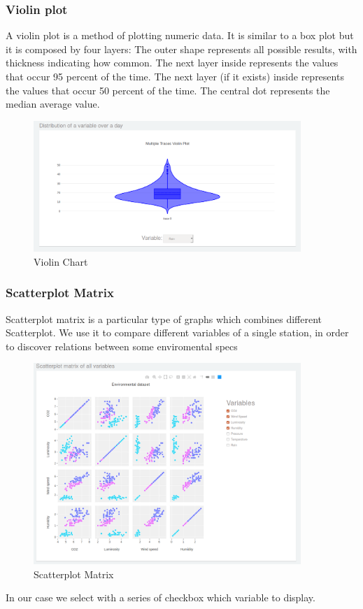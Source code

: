 \documentclass[12pt]{article} %
\begin{document}
\newpage

\subsubsection{Violin plot}
A violin plot is a method of plotting numeric data. It is similar to a box plot but it is composed by four layers: The outer shape represents all possible results, with thickness indicating how common. The next layer inside represents the values that occur 95 percent of the time. The next layer (if it exists) inside represents the values that occur 50 percent of the time. The central dot represents the median average value. 
\begin{figure}[H]
  \centering
  \includegraphics[width=0.9\textwidth]{img/ViolinChart.png}
  \caption{Violin Chart}
  \label{fig:scttrPlot}
\end{figure}

\newpage
\subsubsection{Scatterplot Matrix}
Scatterplot matrix is a particular type of graphs which combines different Scatterplot.
We use it to compare different variables of a single station, in order to discover relations between some enviromental specs
\begin{figure}[H]
  \centering
  \includegraphics[width=0.9\textwidth]{img/ScatterplotMatrix.png}
  \caption{Scatterplot Matrix}
  \label{fig:scttrPlot}
\end{figure}
In our case we select with a series of checkbox which variable to display.
\newpage
\end{document}
